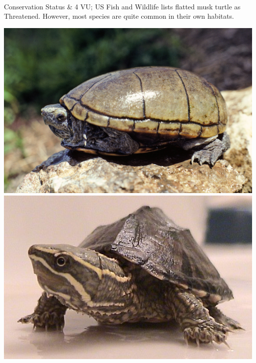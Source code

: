 \begin{center}
\begin{longtabu}
	\\
	\hline
	Conservation Status & 
	4 VU; US Fish and Wildlife lists flatted musk turtle as Threatened. However, most species are quite common in their own habitats.
	\\
	\hline
\end{longtabu}
\includegraphics[scale=0.25]{testudines/kinosternidae/kino1}
\includegraphics[scale=0.5]{testudines/kinosternidae/kino2}
\end{center}
